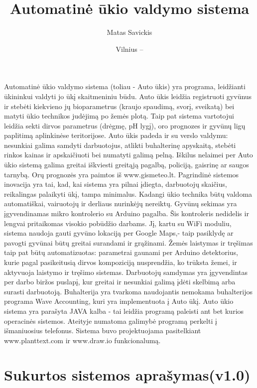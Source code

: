 \documentclass[oneside]{VUMIFPSkursinis}
\title{Automatinė ūkio valdymo sistema}
\author{Matas Savickis}
\date{Vilnius – \the\year}
\begin{document}
\maketitle

\tableofcontents


\centering	
{}
Automatinė ūkio valdymo sistema (toliau - Auto ūkis) yra programa, leidžianti ūkininkui valdyti jo ūkį skaitmeniniu būdu. Auto ūkis leidžia registruoti gyvūnus ir stebėti kiekvieno jų bioparametrus (kraujo spaudimą, svorį, sveikatą) bei matyti ūkio technikos judėjimą po žemės plotą. Taip pat sistema vartotojui leidžia sekti dirvos parametrus (drėgmę, pH lygį), oro prognozes ir gyvūnų ligų paplitimą aplinkinėse teritorijose. Auto ūkis padeda ir su verslo valdymu: nesunkiai galima samdyti darbuotojus, atlikti buhalterinę apyskaitą, stebėti rinkos kainas ir apskaičiuoti bei numatyti galimą pelną. Iškilus nelaimei per Auto ūkio sistemą galima greitai iškviesti greitąją pagalbą, policiją, gaisrinę ar saugos tarnybą. Orų prognozės yra paimtos iš www.gismeteo.lt. Pagrindinė sistemos inovacija yra tai, kad, kai sistema yra pilnai įdiegta, darbuotojų skaičius, reikalingas palaikyti ūkį, tampa minimalus. Kadangi ūkio technika būtų valdoma automatiškai, vairuotojų ir derliaus nurinkėjų nereiktų. Gyvūnų sekimas yra įgyvendinamas mikro kontrolerio su Arduino pagalba. Šis kontroleris nedidelis ir lengvai pritaikomas visokio pobūdžio darbams. Jį, kartu su WiFi moduliu, sistema naudoja gauti gyvūno lokaciją per Google Maps,- taip pasiklydę ar pavogti gyvūnai būtų greitai surandami ir grąžinami. Žemės laistymas ir tręšimas taip pat būtų automatizuotas: parametrai gaunami per Arduino detektorius, kurie pagal pasikeitusią dirvos kompoziciją nusprendžia, ko trūksta žemei, ir aktyvuoja laistymo ir tręšimo sistemas. Darbuotojų samdymas yra įgyvendintas per darbo biržos puslapį, kur greitai ir nesunkiai galimą įdėti skelbimą arba surasti darbuotoją. Buhalterija yra tvarkoma naudojantis nemokama buhalterijos programa Wave Accounting, kuri yra implementuota į Auto ūkį.  Auto ūkio sistema yra parašyta JAVA kalba - tai leidžia programą paleisti ant bet kurios operacinės sistemos. Ateityje numatoma galimybė programą perkelti į išmaniuosius telefonus. Sistema buvo projektuojama pasitelkiant www.planttext.com ir www.draw.io funkcionalumą.

\section{Sukurtos sistemos aprašymas(v1.0)}
\end{document}
